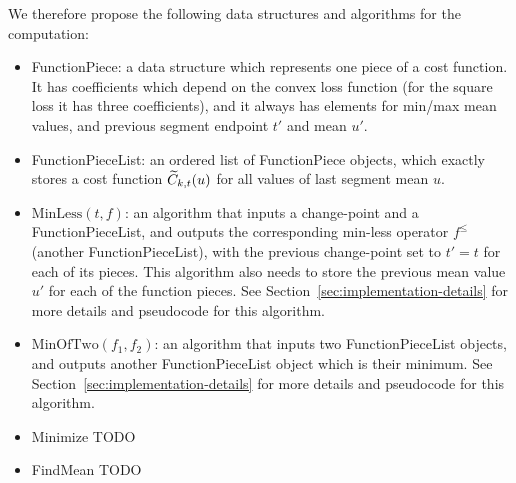 \documentclass{article}
\begin{document}
We therefore propose the following data structures and algorithms for
the computation:
\begin{itemize}
\item FunctionPiece: a data structure which represents one piece of a
  cost function. It has coefficients which depend on the convex loss
  function (for the square loss it has three coefficients), and it
  always has elements for min/max mean values, and previous segment
  endpoint $t'$ and mean $u'$.
\item FunctionPieceList: an ordered list of FunctionPiece objects,
  which exactly stores a cost function $\widetilde{C}_{k,t}(u)$ for all values
  of last segment mean $u$.
\item $\text{MinLess}(t, f)$: an algorithm that inputs a change-point
  and a FunctionPieceList, and outputs the corresponding min-less
  operator $f^\leq$ (another FunctionPieceList), with the previous change-point set to
  $t'=t$ for each of its pieces. This algorithm also needs to store
  the previous mean value $u'$ for each of the function pieces. See
  Section~\ref{sec:implementation-details} for more details and
  pseudocode for this algorithm.
\item $\text{MinOfTwo} (f_1, f_2)$: an algorithm that inputs two
  FunctionPieceList objects, and outputs another FunctionPieceList
  object which is their minimum. See
  Section~\ref{sec:implementation-details} for more details and
  pseudocode for this algorithm.
\item Minimize TODO
\item FindMean TODO
\end{itemize}
\end{document}
